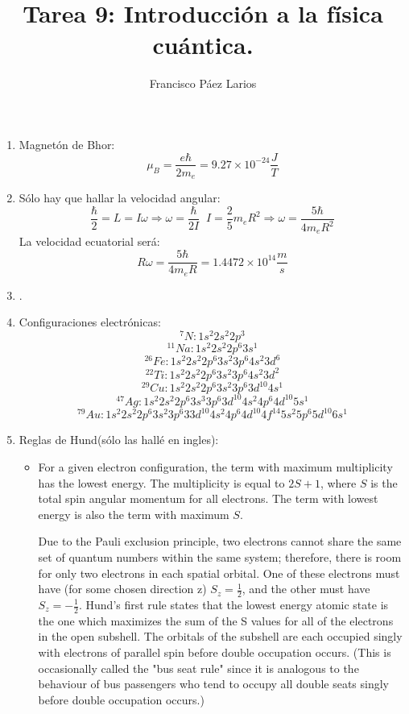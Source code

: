 \documentclass{article}
\title{Tarea 9: Introducción a la física cuántica.}
\author{Francisco Páez Larios}
\begin{document}
\maketitle

\begin{enumerate}

\item Magnetón de Bhor: $$\mu_B= \frac{e \hbar}{2m_e} = 9.27 \times 10^{-24} \frac{J}{T}$$

\item Sólo hay que hallar la velocidad angular:  $$ \frac{\hbar}{2}=L=I \omega \Rightarrow \omega = \frac{\hbar}{2I} \; \; I=\frac{2}{5} m_{e} R^{2} \Rightarrow \omega=\frac{5 \hbar}{4 m_e R^2}$$ La velocidad ecuatorial será: $$ R \omega = \frac{5 \hbar}{4 m_e R}= 1.4472 \times 10^{14} \frac{m}{s}$$

\item .

\item Configuraciones electrónicas: $${^7}N: 1s^2 2s^2 2p^3$$ $${^{11}}Na:1s^2 2s^2 2p^6 3s^1$$ $${^{26}}Fe: 1s^2 2s^2 2p^6 3s^2 3p^6 4s^2 3d^6$$ $${^{22}}Ti: 1s^2 2s^2 2p^6 3s^2 3p^6 4s^2 3d^2 $$ $${^{29}}Cu: 1s^2 2s^2 2p^6 3s^2 3p^6 3d^{10} 4s^1$$ $$ {^{47}}Ag: 1s^2 2s^2 2p^6 3s^3 3p^6 3d^{10} 4s^2 4p^6 4d^{10} 5s^1$$ $${^{79}}Au: 1s^2 2s^2 2p^6 3s^2 3p^6 33d^{10} 4s^2 4p^6 4d^{10} 4f^{14} 5s^2 5p^6 5d^{10} 6s^1 $$ 

\item Reglas de Hund(sólo las hallé en ingles):
\begin{itemize}
\item For a given electron configuration, the term with maximum multiplicity has the lowest energy. The multiplicity is equal to $2S+1$, where $S$  is the total spin angular momentum for all electrons. The term with lowest energy is also the term with maximum $S$.

Due to the Pauli exclusion principle, two electrons cannot share the same set of quantum numbers within the same system; therefore, there is room for only two electrons in each spatial orbital. One of these electrons must have (for some chosen direction z) $ S_z =\frac{1}{2}$, and the other must have$ S_z =-\frac{1}{2}$. Hund's first rule states that the lowest energy atomic state is the one which maximizes the sum of the S values for all of the electrons in the open subshell. The orbitals of the subshell are each occupied singly with electrons of parallel spin before double occupation occurs. (This is occasionally called the "bus seat rule" since it is analogous to the behaviour of bus passengers who tend to occupy all double seats singly before double occupation occurs.)


\end{itemize}
\end{enumerate}
\end{document}
